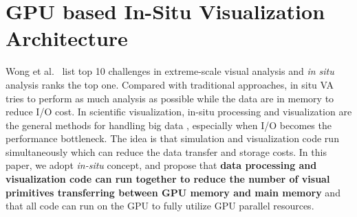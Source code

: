 \documentclass[journal]{vgtc}                %
\begin{document}
{%

 








\section{GPU based In-Situ Visualization Architecture}
Wong et al.~\cite{wong2012top} list top 10 challenges in extreme-scale visual analysis and \emph{in situ} analysis ranks the top one. Compared with traditional approaches, in situ VA tries to perform as much analysis as possible while the data are in memory to reduce I/O cost. In scientific visualization, in-situ processing and visualization are the general methods for handling big data \cite{ma2007situ}, especially when I/O becomes the performance bottleneck. The idea is that simulation and visualization code run simultaneously which can reduce the data transfer and storage costs. In this paper, we adopt \emph{in-situ} concept, and propose that 
\textbf{data processing and visualization code can run together to reduce the number of visual primitives transferring between GPU memory and main memory} and that all code can run on the GPU to fully utilize GPU parallel resources.

}
\end{document}
